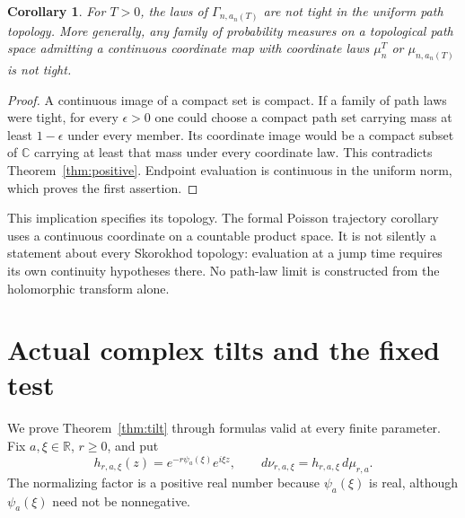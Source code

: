 \documentclass[11pt]{article}
\newtheorem{corollary}[theorem]{Corollary}
\newcommand{\C}{\mathbb C}\newcommand{\R}{\mathbb R}
\begin{document}
\begin{corollary}\label{cor:path}
For $T>0$, the laws of $\Gamma_{n,a_n(T)}$ are not tight in the uniform
path topology. More generally, any family of probability measures on a
topological path space admitting a continuous coordinate map with
coordinate laws $\mu_n^T$ or $\mu_{n,a_n(T)}$ is not tight.
\end{corollary}
\begin{proof}
A continuous image of a compact set is compact. If a family of path laws
were tight, for every $\epsilon>0$ one could choose a compact path set
carrying mass at least $1-\epsilon$ under every member. Its coordinate
image would be a compact subset of $\C$ carrying at least that mass under
every coordinate law. This contradicts Theorem~\ref{thm:positive}.
Endpoint evaluation is continuous in the uniform norm, which proves the
first assertion.
\end{proof}

This implication specifies its topology. The formal Poisson trajectory
corollary uses a continuous coordinate on a countable product space.
It is not silently a statement about every Skorokhod topology: evaluation
at a jump time requires its own continuity hypotheses there. No path-law
limit is constructed from the holomorphic transform alone.

\section{Actual complex tilts and the fixed test}
We prove Theorem~\ref{thm:tilt} through formulas valid at every finite
parameter. Fix $a,\xi\in\R$, $r\geq0$, and put
\[
 h_{r,a,\xi}(z)=e^{-r\psi_a(\xi)}e^{i\xi z},\qquad
 d\nu_{r,a,\xi}=h_{r,a,\xi}\,d\mu_{r,a}.
\]
The normalizing factor is a positive real number because $\psi_a(\xi)$
is real, although $\psi_a(\xi)$ need not be nonnegative.
\end{document}

